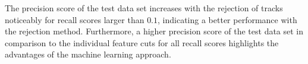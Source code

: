 The precision score of the test data set increases with the rejection of tracks noticeably for recall scores larger than $0.1$, indicating a better performance with the rejection method.
Furthermore, a higher precision score of the test data set in comparison to the individual feature cuts for all recall scores highlights the advantages of the machine
learning approach.
